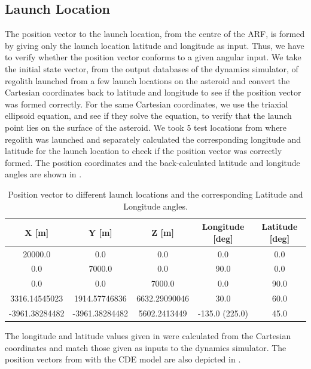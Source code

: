 \subsection{Launch Location}
\label{subsec:launch_location_vv}
The position vector to the launch location, from the centre of the \gls{ARF}, is formed by giving only the launch location latitude and longitude as input. Thus, we have to verify whether the position vector conforms to a given angular input. We take the initial state vector, from the output databases of the dynamics simulator, of regolith launched from a few launch locations on the asteroid and convert the Cartesian coordinates back to latitude and longitude to see if the position vector was formed correctly. For the same Cartesian coordinates, we use the triaxial ellipsoid equation, and see if they solve the equation, to verify that the launch point lies on the surface of the asteroid.
%
\newline\newline
%
We took 5 test locations from where regolith was launched and separately calculated the corresponding longitude and latitude for the launch location to check if the position vector was correctly formed. The position coordinates and the back-calculated latitude and longitude angles are shown in .
\begin{table}[htb]
\centering
\captionsetup{justification=centering}
\caption{Position vector to different launch locations and the corresponding Latitude and Longitude angles.}
\label{tab:position_vector_to_lat_long_vv}
\begin{tabular}{|c|c|c|c|c|}
\hline
\textbf{X {[}m{]}} & \textbf{Y {[}m{]}} & \textbf{Z {[}m{]}} & \textbf{Longitude {[}deg{]}} & \textbf{Latitude {[}deg{]}} \\ \hline
20000.0 & 0.0 & 0.0 & 0.0 & 0.0 \\ \hline
0.0 & 7000.0 & 0.0 & 90.0 & 0.0 \\ \hline
0.0 & 0.0 & 7000.0 & 0.0 & 90.0 \\ \hline
3316.14545023 & 1914.57746836 & 6632.29090046 & 30.0 & 60.0 \\ \hline
-3961.38284482 & -3961.38284482 & 5602.2413449 & -135.0 (225.0) & 45.0 \\ \hline
\end{tabular}
\end{table}
\FloatBarrier
The longitude and latitude values given in  were calculated from the Cartesian coordinates and match those given as inputs to the dynamics simulator. The position vectors from  with the \gls{CDE} model are also depicted in .
